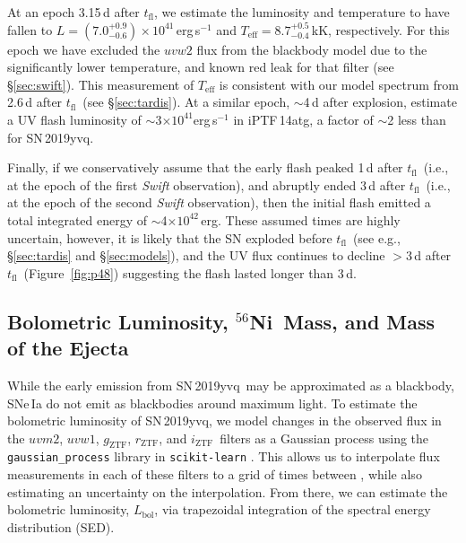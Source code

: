\documentclass[twocolumn]{aastex63}
\newcommand{\rztf}{$r_\mathrm{ZTF}$}
\newcommand{\gztf}{$g_\mathrm{ZTF}$}
\newcommand{\iztf}{$i_\mathrm{ZTF}$}
\newcommand{\tfl}{$t_\mathrm{fl}$}
\newcommand{\radni}{$^{56}$Ni}
\newcommand{\sn}{SN\,2019yvq}
\begin{document}
At an epoch 3.15\,d after \tfl, we estimate the luminosity and temperature to
have fallen to $L = (7.0^{+0.9}_{-0.6}) \times 10^{41}$\,erg\,s$^{-1}$ and
$T_\mathrm{eff} = 8.7^{+0.5}_{-0.4}$\,kK, respectively. For this epoch we have
excluded the $uvw2$ flux from the blackbody model due to the significantly
lower temperature, and known red leak for that filter (see \S\ref{sec:swift}).
This measurement of $T_\mathrm{eff}$ is consistent with our model spectrum
from 2.6\,d after \tfl\ (see \S\ref{sec:tardis}). At a similar epoch,
$\sim$4\,d after explosion, \citet{Cao15} estimate a UV flash luminosity of
$\sim$3$ \times 10^{41}$erg\,s$^{-1}$ in iPTF\,14atg, a factor of $\sim$2 less
than for \sn.

Finally, if we conservatively assume that the early flash peaked 1\,d after
\tfl\ (i.e., at the epoch of the first \textit{Swift} observation), and
abruptly ended 3\,d after \tfl\ (i.e., at the epoch of the second
\textit{Swift} observation), then the initial flash emitted a total integrated
energy of $\sim$4$\times 10^{42}$\,erg.
These assumed times are highly uncertain, however, it is likely that the SN
exploded before \tfl\ (see e.g., \S\ref{sec:tardis} and \S\ref{sec:models}),
and the UV flux continues to decline $>$3\,d after \tfl\
(Figure~\ref{fig:p48}) suggesting the flash lasted longer than 3\,d.

\subsection{Bolometric Luminosity, \radni\ Mass, and Mass of the Ejecta}\label{sec:ni_mass}

While the early emission from \sn\ may be approximated as a blackbody, SNe\,Ia
do not emit as blackbodies around maximum light. To estimate the bolometric
luminosity of \sn, we model changes in the observed flux in the $uvm2$,
$uvw1$, \gztf, \rztf, and \iztf\ filters as a Gaussian process
\citep{Rasmussen06} using the \texttt{gaussian\_process} library in
\texttt{scikit-learn} \citep{Pedregosa11}. This allows us to interpolate flux
measurements in each of these filters to a grid of times between \edit1{1 and
70\,d after \tfl}, while also estimating an uncertainty on the interpolation.
From there, we can estimate the bolometric luminosity, $L_\mathrm{bol}$, via
trapezoidal integration of the spectral energy distribution (SED).
\end{document}
